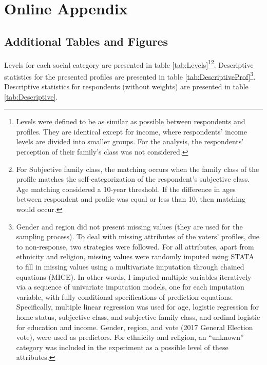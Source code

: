 \documentclass[]{cupjournal}
\author{}
\date{}
\begin{document}
	
%    




\vskip 6.5pt

\noindent  \hypertarget{online-appendix}{%
\section{Online Appendix}\label{online-appendix}}

\hypertarget{additional-tables-and-figures}{%
\subsection{Additional Tables and Figures}\label{additional-tables-and-figures}}

Levels for each social category are presented in table \ref{tab:Levels}\footnote{Levels were defined to be as similar as possible between respondents and profiles. They are identical except for income, where respondents' income levels are divided into smaller groups. For the analysis, the respondents' perception of their family's class was not considered.}\footnote{For Subjective family class, the matching occurs when the family class of the profile matches the self-categorization of the respondent's subjective class. Age matching considered a 10-year threshold. If the difference in ages between respondent and profile was equal or less than 10, then matching would occur.}. Descriptive statistics for the presented profiles are presented in table \ref{tab:DescriptiveProf}\footnote{Gender and region did not present missing values (they are used for the sampling process). To deal with missing attributes of the voters' profiles, due to non-response, two strategies were followed. For all attributes, apart from ethnicity and religion, missing values were randomly imputed using STATA to fill in missing values using a multivariate imputation through chained equations (MICE). In other words, I imputed multiple variables iteratively via a sequence of univariate imputation models, one for each imputation variable, with fully conditional specifications of prediction equations. Specifically, multiple linear regression was used for age, logistic regression for home status, subjective class, and subjective family class, and ordinal logistic for education and income. Gender, region, and vote (2017 General Election vote), were used as predictors. For ethnicity and religion, an ``unknown'' category was included in the experiment as a possible level of these attributes.}. Descriptive statistics for respondents (without weights) are presented in table \ref{tab:Descriptive}.
\end{document}
